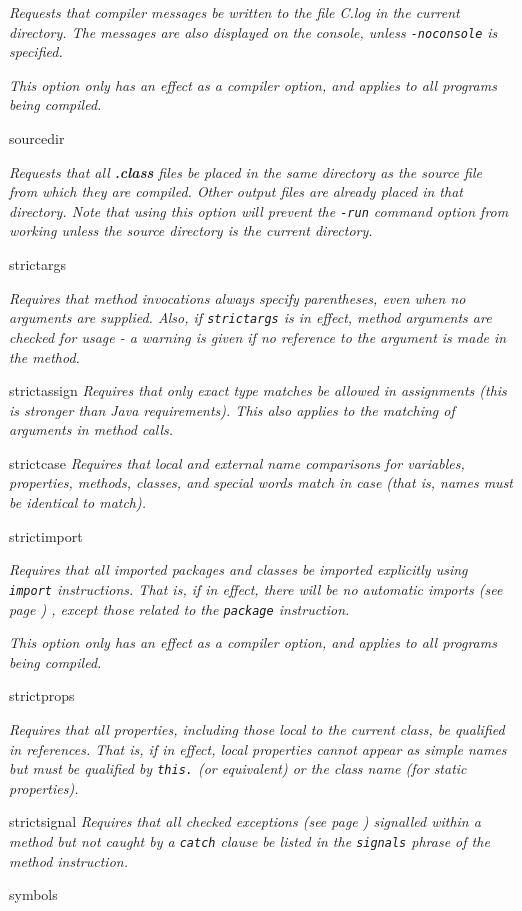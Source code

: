 \begin{description}
\emph{Requests that compiler messages be written to the file \nr{}C.log in
the current directory.
The messages are also displayed on the console, unless
\texttt{-noconsole} is specified.}
 
\emph{This option only has an effect as a compiler option, and applies to all
programs being compiled.}
\item{sourcedir}

\emph{Requests that all \textbf{.class} files be placed in the same
directory as the source file from which they are compiled.  Other output
files are already placed in that directory.
Note that using this option will prevent the \texttt{-run} command
option from working unless the source directory is the current
directory.}
\item{strictargs}

\emph{Requires that method invocations always specify parentheses, even
when no arguments are supplied.  Also, if \texttt{strictargs} is in
effect, method arguments are checked for usage - a warning is given
if no reference to the argument is made in the method.}
\item{strictassign}
\emph{Requires that only exact type matches be allowed in assignments
(this is stronger than Java requirements).
This also applies to the matching of arguments in method calls.}
\item{strictcase}
\emph{Requires that local and external name comparisons for variables,
properties, methods, classes, and special words match in case (that is,
names must be identical to match).}
\item{strictimport}

\emph{Requires that all imported packages and classes be imported
explicitly using \texttt{import} instructions.  That is, if in effect,
there will be no  automatic imports (see page \pageref{refimport}) , except those
related to the \texttt{package} instruction.}
 
\emph{This option only has an effect as a compiler option, and applies to all
programs being compiled.}
\item{strictprops}

\emph{Requires that all properties, including those local to the
current class, be qualified in references.
That is, if in effect, local properties cannot appear as simple names
but must be qualified by \texttt{this.} (or equivalent) or the class name
(for static properties).}
\item{strictsignal}
\emph{Requires that all  checked exceptions (see page \pageref{refchecked}) 
signalled within a method but not caught by a \texttt{catch} clause be
listed in the \texttt{signals} phrase of the method instruction.}
\item{symbols}


\end{description}
